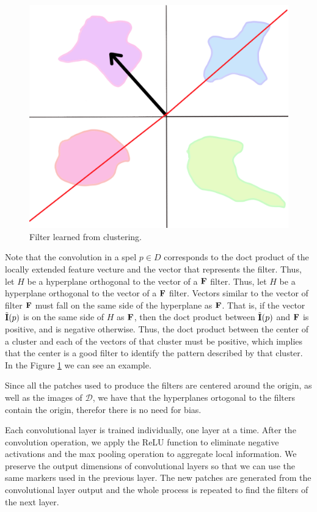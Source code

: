 \documentclass[a4paper,conference]{IEEEtran}
\newcommand{\D}{\mathcal{D}}
\newcommand{\m}[1]{{\mathrm{\bf #1}}}
\newcommand{\E}{\tilde{\m{I}}}
\newcommand{\mF}{\m{F}}
\begin{document}
\begin{figure}[t]
  \begin{center}
     \includegraphics[width=0.8\linewidth]{figures/filter.png}
  \end{center}
  \caption{Filter learned from clustering.}
  \label{fig:filter}
\end{figure}


Note that the convolution in a spel $p \in D$ corresponds to the doct product of the locally extended feature vecture and the vector that represents the filter. Thus, let $H$ be a hyperplane orthogonal to the vector of a $\mF$ filter. Thus, let $ H $ be a hyperplane orthogonal to the vector of a $ \mF$ filter. Vectors similar to the vector of filter $\mF$ must fall on the same side of the hyperplane as $\mF$. That is, if the vector $\E(p)$ is on the same side of $H$ as $\mF$, then the doct product between $\E (p)$ and $\mF$ is positive, and is negative otherwise. Thus, the doct product between the center of a cluster and each of the vectors of that cluster must be positive, which implies that the center is a good filter to identify the pattern described by that cluster. In the Figure \ref{fig:filter} we can see an example.


Since all the patches used to produce the filters are centered around the origin, as well as the images of $\D$, we have that the hyperplanes ortogonal to the filters contain the origin, therefor there is no need for bias.

Each convolutional layer is trained individually, one layer at a time. After the convolution operation, we apply the ReLU function to eliminate negative activations and the max pooling operation to aggregate local information. We preserve the output dimensions of convolutional layers so that we can use the same markers used in the previous layer. The new patches are generated from the convolutional layer output and the whole process is repeated to find the filters of the next layer.
\end{document}
